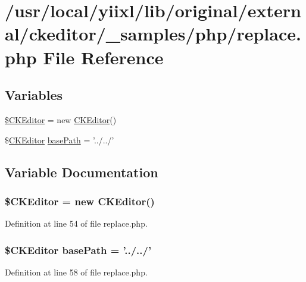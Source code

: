 \hypertarget{replace_8php}{
\section{/usr/local/yiixl/lib/original/external/ckeditor/\_\-samples/php/replace.php File Reference}
\label{replace_8php}
}
\subsection*{Variables}
\begin{DoxyCompactItemize}
\item 
\hyperlink{replace_8php_aec6d261a24c9dcb30ee1cfa7762a4a44}{\$CKEditor} = new \hyperlink{classCKEditor}{CKEditor}()
\item 
\$\hyperlink{classCKEditor}{CKEditor} \hyperlink{replace_8php_a94a267f018012b013582daafb6a89618}{basePath} = '../../'
\end{DoxyCompactItemize}


\subsection{Variable Documentation}
\hypertarget{replace_8php_aec6d261a24c9dcb30ee1cfa7762a4a44}{
\subsubsection[{\$CKEditor}]{\setlength{\rightskip}{0pt plus 5cm}\${\bf CKEditor} = new {\bf CKEditor}()}}
\label{replace_8php_aec6d261a24c9dcb30ee1cfa7762a4a44}


Definition at line 54 of file replace.php.

\hypertarget{replace_8php_a94a267f018012b013582daafb6a89618}{
\subsubsection[{basePath}]{\setlength{\rightskip}{0pt plus 5cm}\${\bf CKEditor} {\bf basePath} = '../../'}}
\label{replace_8php_a94a267f018012b013582daafb6a89618}


Definition at line 58 of file replace.php.

